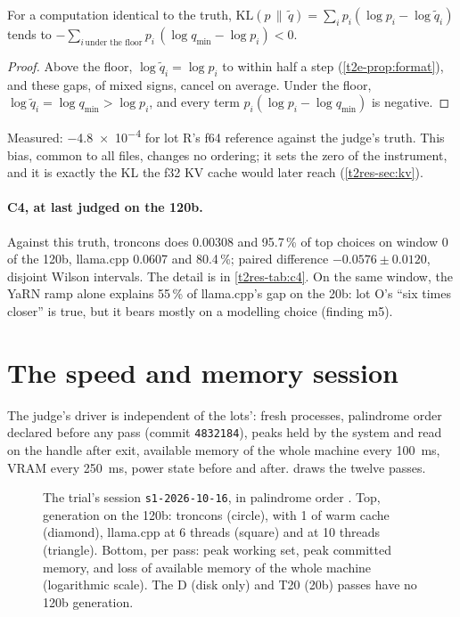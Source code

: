 \begin{lemme}\label{t2e-lem:kl-negative}
For a computation identical to the truth, $\mathrm{KL}(p\,\|\,\tilde q) = \sum_i p_i (\log p_i - \log \tilde q_i)$ tends to $-\sum_{i \,\text{under the floor}} p_i\,(\log q_{\min} - \log p_i) < 0$.
\end{lemme}
\begin{proof}
Above the floor, $\log \tilde q_i = \log p_i$ to within half a step (\cref{t2e-prop:format}), and these gaps, of mixed signs, cancel on average. Under the floor, $\log \tilde q_i = \log q_{\min} > \log p_i$, and every term $p_i(\log p_i - \log q_{\min})$ is negative.
\end{proof}

Measured: \num{-4.8e-4} for lot R's f64 reference against the judge's truth. This bias, common to all files, changes no ordering; it sets the zero of the instrument, and it is exactly the KL the f32 KV cache would later reach (\cref{t2res-sec:kv}).

\paragraph{C4, at last judged on the 120b.} Against this truth, troncons does \num{0.00308} and \num{95.7}\,\% of top choices on window 0 of the 120b, llama.cpp \num{0.0607} and \num{80.4}\,\%; paired difference $-\num{0.0576} \pm \num{0.0120}$, disjoint Wilson intervals. The detail is in \cref{t2res-tab:c4}. On the same window, the YaRN ramp alone explains \num{55}\,\% of llama.cpp's gap on the 20b: lot O's ``six times closer'' is true, but it bears mostly on a modelling choice (finding m5).

\section{The speed and memory session}\label{t2e-sec:seance}

The judge's driver is independent of the lots': fresh processes, palindrome order declared before any pass (commit \texttt{4832184}), peaks held by the system and read on the handle after exit, available memory of the whole machine every \SI{100}{\milli\second}, VRAM every \SI{250}{\milli\second}, power state before and after.  draws the twelve passes.

\begin{figure}[ht]
\centering
\GrapheResSeance
\caption[The trial's session, pass by pass]{The trial's session \texttt{s1-2026-10-16}, in palindrome order \mes. Top, generation on the 120b: troncons (circle), with \SI{1}{\Go} of warm cache (diamond), llama.cpp at 6 threads (square) and at 10 threads (triangle). Bottom, per pass: peak working set, peak committed memory, and loss of available memory of the whole machine (logarithmic scale). The D (disk only) and T20 (20b) passes have no 120b generation.}
\label{t2e-fig:seance}
\end{figure}

